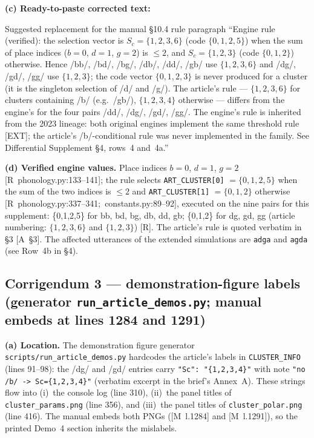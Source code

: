 \documentclass[11pt,letterpaper]{article}
\newcommand{\code}[1]{\texttt{#1}}
\begin{document}
\textbf{(c) Ready-to-paste corrected text:}
\begin{pastebox}{Suggested replacement for the manual \S10.4 rule paragraph}
\small
``Engine rule (verified): the selection vector is $S_c = \{1,2,3,6\}$ (code
$\{0,1,2,5\}$) when the sum of place indices ($b = 0$, $d = 1$, $g = 2$) is
$\le 2$, and $S_c = \{1,2,3\}$ (code $\{0,1,2\}$) otherwise. Hence /bb/,
/bd/, /bg/, /db/, /dd/, /gb/ use $\{1,2,3,6\}$ and /dg/, /gd/, /gg/ use
$\{1,2,3\}$; the code vector $\{0,1,2,3\}$ is never produced for a cluster
(it is the singleton selection of /d/ and /g/). The article's rule ---
$\{1,2,3,6\}$ for clusters containing /b/ (e.g.\ /gb/), $\{1,2,3,4\}$
otherwise --- differs from the engine's for the four pairs /dd/, /dg/, /gd/,
/gg/. The engine's rule is inherited from the 2023 lineage: both original
engines implement the same threshold rule [EXT]; the article's
/b/-conditional rule was never implemented in the family. See Differential
Supplement \S4, rows~4 and~4a.''
\end{pastebox}

\noindent\textbf{(d) Verified engine values.} Place indices $b{=}0$,
$d{=}1$, $g{=}2$ \hbox{[R phonology.py:133--141]}; the rule selects
\code{ART\_CLUSTER[0]} $=\{0,1,2,5\}$ when the sum of the two indices is
$\le 2$ and \code{ART\_CLUSTER[1]} $=\{0,1,2\}$ otherwise
\hbox{[R phonology.py:337--341; constants.py:89--92]}, executed on the nine
pairs for this supplement: \{0,1,2,5\} for bb, bd, bg, db, dd, gb;
\{0,1,2\} for dg, gd, gg (article numbering: $\{1,2,3,6\}$ and
$\{1,2,3\}$) \hbox{[R]}. The article's rule is quoted verbatim in \S3
\hbox{[A \S3]}. The affected utterances of the extended simulations are
\code{adga} and \code{agda} (see Row~4b in \S4).

\subsection*{Corrigendum 3 --- demonstration-figure labels
(generator \code{run\_article\_demos.py}; manual embeds at lines 1284
and 1291)}

\textbf{(a) Location.} The demonstration figure generator
\code{scripts/run\_article\_demos.py} hardcodes the article's labels in
\code{CLUSTER\_INFO} (lines 91--98): the /dg/ and /gd/ entries carry
\code{"Sc": "\{1,2,3,4\}"} with note \code{"no /b/ -> Sc=\{1,2,3,4\}"} (verbatim
excerpt in the brief's Annex~A). These strings flow into (i)~the console log
(line 310), (ii)~the panel titles of \code{cluster\_params.png} (line 356),
and (iii)~the panel titles of \code{cluster\_polar.png} (line 416). The manual
embeds both PNGs (\hbox{[M l.1284]} and \hbox{[M l.1291]}), so the printed
Demo~4 section inherits the mislabels.
\end{document}
